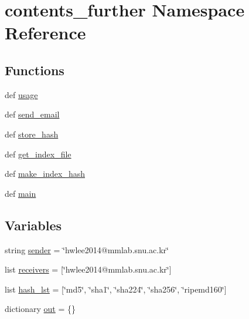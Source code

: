 \hypertarget{namespacecontents__further}{\section{contents\-\_\-further Namespace Reference}
\label{namespacecontents__further}
}
\subsection*{Functions}
\begin{DoxyCompactItemize}
\item 
def \hyperlink{namespacecontents__further_a0870425e02492580912f7ebf1278a5c7}{usage}
\item 
def \hyperlink{namespacecontents__further_aa61f7fc274d57d4b0f624abf9e9c4bf3}{send\-\_\-email}
\item 
def \hyperlink{namespacecontents__further_a1c62a4a01c8cd0f31525e28b886d52a6}{store\-\_\-hash}
\item 
def \hyperlink{namespacecontents__further_a69cccccb83b6bc21e283b960a229535d}{get\-\_\-index\-\_\-file}
\item 
def \hyperlink{namespacecontents__further_a7aa9e71cfc09e609da7aa0076a1254df}{make\-\_\-index\-\_\-hash}
\item 
def \hyperlink{namespacecontents__further_a622f8f503681a783a04a535e8294fea9}{main}
\end{DoxyCompactItemize}
\subsection*{Variables}
\begin{DoxyCompactItemize}
\item 
string \hyperlink{namespacecontents__further_a7480f74ed6ccf0d04f96c73db969bbdb}{sender} = \char`\"{}hwlee2014@mmlab.\-snu.\-ac.\-kr\char`\"{}
\item 
list \hyperlink{namespacecontents__further_a646b167511af908b54ec28b31bb848b0}{receivers} = \mbox{[}\char`\"{}hwlee2014@mmlab.\-snu.\-ac.\-kr\char`\"{}\mbox{]}
\item 
list \hyperlink{namespacecontents__further_a1ff7ba576b1dcc906cd0fedc610d5ae8}{hash\-\_\-lst} = \mbox{[}\char`\"{}md5\char`\"{}, \char`\"{}sha1\char`\"{}, \char`\"{}sha224\char`\"{}, \char`\"{}sha256\char`\"{}, \char`\"{}ripemd160\char`\"{}\mbox{]}
\item 
dictionary \hyperlink{namespacecontents__further_a3535cdabeeec1dd45ec8ae4082ecccb6}{out} = \{\}
\end{DoxyCompactItemize}


